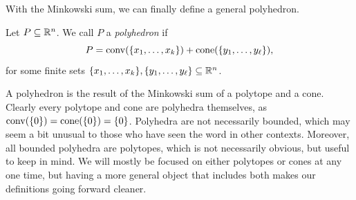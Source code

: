 \documentclass[12pt,oneside]{../../sfsuthesis}
\begin{document}
With the Minkowski sum, we can finally define a general polyhedron.
\begin{definition}[Polyhedron]\th\label{def:polyhedron}
    Let \( P \subseteq \mathbb{R}^n \). We call \( P \) a \emph{polyhedron} if
    \[
        P = \operatorname{conv}(\{x_1, \dots, x_k\}) + \mathrm{cone}(\{y_1, \dots, y_\ell\}),
    \]
    for some finite sets \( \{x_1, \dots, x_k\}, \{y_1, \dots, y_\ell\} \subseteq \mathbb{R}^n \).
\end{definition}
A polyhedron is the result of the Minkowski sum of a polytope and a cone.
Clearly every polytope and cone are polyhedra themselves, as \( \operatorname{conv}(\{0\}) = \mathrm{cone}(\{0\}) = \{ 0 \} \).
Polyhedra are not necessarily bounded, which may seem a bit unusual to those who have seen the word in other contexts.
Moreover, all bounded polyhedra are polytopes, which is not necessarily obvious, but useful to keep in mind.
We will mostly be focused on either polytopes or cones at any one time, but having a more general object that includes both makes our definitions going forward cleaner.
\end{document}
